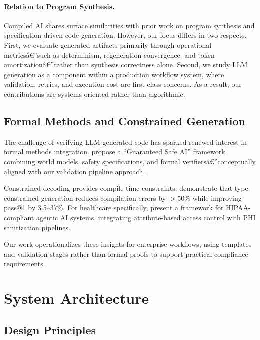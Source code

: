 \documentclass[11pt]{article}
\begin{document}
\paragraph{Relation to Program Synthesis.}
Compiled AI shares surface similarities with prior work on program synthesis and specification-driven code generation. However, our focus differs in two respects. First, we evaluate generated artifacts primarily through operational metricsâ€”such as determinism, regeneration convergence, and token amortizationâ€”rather than synthesis correctness alone. Second, we study LLM generation as a component within a production workflow system, where validation, retries, and execution cost are first-class concerns. As a result, our contributions are systems-oriented rather than algorithmic.

\subsection{Formal Methods and Constrained Generation}

The challenge of verifying LLM-generated code has sparked renewed interest in formal methods integration. \citet{dalrymple2024guaranteed} propose a ``Guaranteed Safe AI'' framework combining world models, safety specifications, and formal verifiersâ€”conceptually aligned with our validation pipeline approach.

Constrained decoding provides compile-time constraints: \citet{mundler2025typeconstrained} demonstrate that type-constrained generation reduces compilation errors by $>$50\% while improving pass@1 by 3.5--37\%. For healthcare specifically, \citet{neupane2025hipaa} present a framework for HIPAA-compliant agentic AI systems, integrating attribute-based access control with PHI sanitization pipelines.

Our work operationalizes these insights for enterprise workflows, using templates and validation stages rather than formal proofs to support practical compliance requirements.

\section{System Architecture}
\label{sec:architecture}

\subsection{Design Principles}
\end{document}

